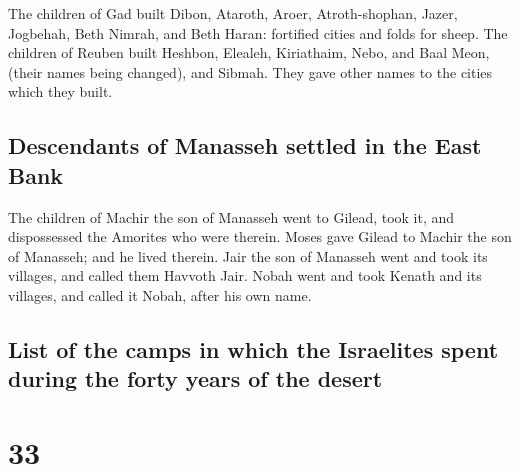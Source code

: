  The children of Gad built Dibon, Ataroth, Aroer,
 Atroth-shophan, Jazer, Jogbehah,  Beth
Nimrah, and Beth Haran: fortified cities and folds for sheep.
 The children of Reuben built Heshbon, Elealeh,
Kiriathaim,  Nebo, and Baal Meon, (their names being
changed), and Sibmah. They gave other names to the cities which they
built.

\hypertarget{descendants-of-manasseh-settled-in-the-east-bank}{%
\subsection{Descendants of Manasseh settled in the East
Bank}\label{descendants-of-manasseh-settled-in-the-east-bank}}

 The children of Machir the son of Manasseh went to
Gilead, took it, and dispossessed the Amorites who were therein.
 Moses gave Gilead to Machir the son of Manasseh; and he
lived therein.  Jair the son of Manasseh went and took
its villages, and called them Havvoth Jair.  Nobah went
and took Kenath and its villages, and called it Nobah, after his own
name.

\hypertarget{list-of-the-camps-in-which-the-israelites-spent-during-the-forty-years-of-the-desert}{%
\subsection{List of the camps in which the Israelites spent during the
forty years of the
desert}\label{list-of-the-camps-in-which-the-israelites-spent-during-the-forty-years-of-the-desert}}

\hypertarget{section-32}{%
\section{33}\label{section-32}}

